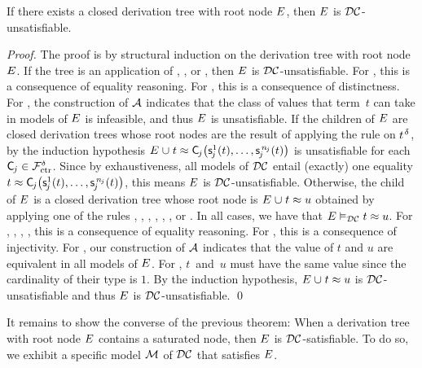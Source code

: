 \begin{theorem}%
\label{thm:rs}%
\afterDot
If there exists a closed derivation tree with root node\/ $E$, then\/ $E$ is $\mathcal{DC}$-unsatisfiable.
\end{theorem}
\begin{proof}
The proof is by structural induction on the derivation tree with root node $E$.
If the tree is an application of , , or ,
then $E$ is $\mathcal{DC}$-unsatisfiable.
For , this is a consequence of equality reasoning.
For , this is a consequence of distinctness.
For , the construction of $\mathcal{A}$ indicates that the class of values that term~$t$ can take in models of $E$ is infeasible,
and thus $E$ is unsatisfiable.
If the children of $E$ are closed derivation trees
whose root nodes are the result of applying the rule  on $t\typ{\delta}$,
by the induction hypothesis $E \mathrel\cup t \approx \smash{\textsf{C}_{\kern-0.083333em j}\bigl( \textsf{s}^1_{\kern-0.083333em j}( t ), \ldots, \textsf{s}^{\,\smash{n_{\kern-0.083333em j}}}_{\kern-0.083333em j}( t ) \bigr)}$ is unsatisfiable
for each $\textsf{C}_{\kern-0.083333em j} \in \smash{\mathcal{F}_{\mathrm{ctr}}^\delta}$.
Since by exhaustiveness, all models of $\mathcal{DC}$ entail (exactly) one equality $t \approx \textsf{C}_{\kern-0.083333em j}\bigl( \textsf{s}^1_{\kern-0.083333em j}( t ), \ldots, \textsf{s}^{\,\smash{n_{\kern-0.083333em j}}}_{\kern-0.083333em j}( t ) \bigr)$,
this means $E$ is $\mathcal{DC}$-unsatisfiable.
Otherwise, the child of $E$ is a closed derivation tree
whose root node is $E \mathrel\cup t \approx u$ obtained by applying one of the rules , , , , , , or .
In all cases, we have that $E \vDash_{\mathcal{DC}} t \approx u$.
For , , , , this is a consequence of equality reasoning.
For , this is a consequence of injectivity.
For , our construction of $\mathcal{A}$ indicates that the value of $t$ and $u$ are equivalent in all models of $E$.
For , $t$~and~$u$ must have the same value since the cardinality of their type is $1$.
By the induction hypothesis, $E \mathrel\cup t \approx u$ is $\mathcal{DC}$-unsatisfiable
and thus $E$ is $\mathcal{DC}$-unsatisfiable.
\qed
\end{proof}

It remains to show the converse of the previous theorem: When a derivation tree
with root node $E$ contains a saturated node, then $E$ is
$\mathcal{DC}$-satisfiable.
To do so, we exhibit a specific model $\mathcal{M}$ of $\mathcal{DC}$ that satisfies $E$.

